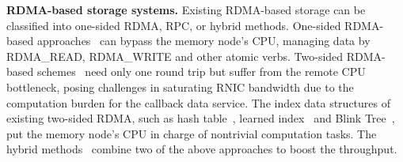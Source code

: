 \textbf{RDMA-based storage systems.} 
Existing RDMA-based storage can be classified into one-sided RDMA, RPC, or hybrid methods.
One-sided RDMA-based approaches~\cite{drtmr,farm,rolex,race,smart,cowbird} can bypass the memory node's CPU, managing data by RDMA\_READ, RDMA\_WRITE and other atomic verbs. 
Two-sided RDMA-based schemes~\cite{fasst,guidelines,reflex,stingray,smash} need only one round trip but suffer from the remote CPU bottleneck, posing challenges in saturating RNIC bandwidth due to the computation burden for the callback data service. The index data structures of existing two-sided RDMA, such as hash table~\cite{pilaf,mica}, learned index~\cite{finedex, rolex} and Blink Tree~\cite{kraska}, put the memory node's CPU in charge of nontrivial computation tasks. 
The hybrid methods~\cite{cell,drtmh,herd,hstore} combine two of the above approaches to boost the throughput. 


